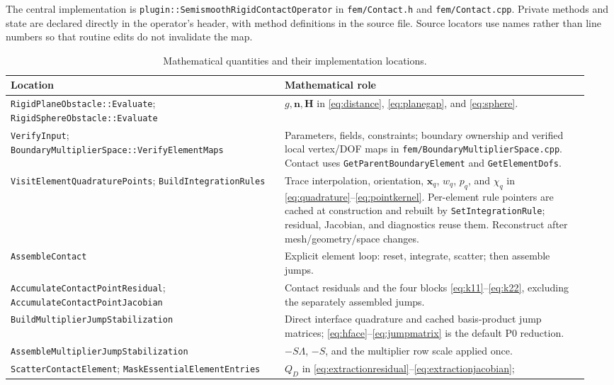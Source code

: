 \documentclass[preprint,11pt]{elsarticle}
\numberwithin{equation}{section}
\newcommand{\bx}{\boldsymbol{x}}
\newcommand{\bn}{\boldsymbol{n}}
\newcommand{\bH}{\boldsymbol{H}}
\newcommand{\code}[1]{\texttt{\nolinkurl{#1}}}
\begin{document}
The central implementation is \code{plugin::SemismoothRigidContactOperator}
in \code{fem/Contact.h} and \code{fem/Contact.cpp}. Private methods and state
are declared directly in the operator's header, with method definitions in
the source file. Source locators use names rather than line numbers so that
routine edits do not invalidate the map.

\begin{table}[!ht]
\centering
\small
\caption{Mathematical quantities and their implementation locations.}
\label{tab:codemap}
\begin{tabular}{@{}p{0.45\linewidth}p{0.50\linewidth}@{}}
\toprule
Location & Mathematical role\\
\midrule
\code{RigidPlaneObstacle::Evaluate}; \code{RigidSphereObstacle::Evaluate}
 & $g,\bn,\bH$ in \eqref{eq:distance}, \eqref{eq:planegap}, and
 \eqref{eq:sphere}.\\[4pt]
\code{VerifyInput}; \code{BoundaryMultiplierSpace::VerifyElementMaps}
 & Parameters, fields, constraints; boundary ownership and verified local
 vertex/DOF maps in \code{fem/BoundaryMultiplierSpace.cpp}. Contact uses
 \code{GetParentBoundaryElement} and \code{GetElementDofs}.\\[4pt]
\code{VisitElementQuadraturePoints}; \code{BuildIntegrationRules}
 & Trace interpolation, orientation, $\bx_q$, $w_q$, $p_q$, and
  $\chi_q$ in \eqref{eq:quadrature}--\eqref{eq:pointkernel}. Per-element rule
  pointers are cached at construction and rebuilt by \code{SetIntegrationRule};
  residual, Jacobian, and diagnostics reuse them. Reconstruct after
  mesh/geometry/space changes.\\[4pt]
\code{AssembleContact}
 & Explicit element loop: reset, integrate, scatter; then assemble jumps.\\[4pt]
\code{AccumulateContactPointResidual}; \code{AccumulateContactPointJacobian}
 & Contact residuals and the four blocks
 \eqref{eq:k11}--\eqref{eq:k22}, excluding the separately assembled jumps.\\[4pt]
\code{BuildMultiplierJumpStabilization}
 & Direct interface quadrature and cached basis-product jump matrices;
 \eqref{eq:hface}--\eqref{eq:jumpmatrix} is the default P0 reduction.\\[4pt]
\code{AssembleMultiplierJumpStabilization}
 & $-S\Lambda$, $-S$, and the multiplier row scale applied once.\\[4pt]
\code{ScatterContactElement}; \code{MaskEssentialElementEntries}
 & $Q_D$ in \eqref{eq:extractionresidual}--\eqref{eq:extractionjacobian};

\end{tabular}
\end{table}
\end{document}
